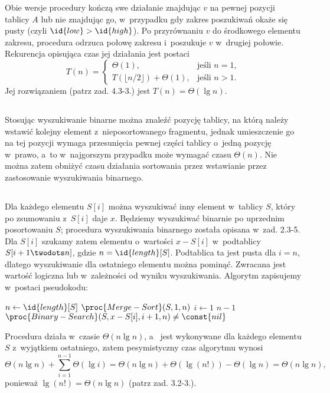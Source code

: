 Obie wersje procedury  kończą swe działanie znajdując $v$ na pewnej pozycji tablicy $A$ lub nie znajdując go, w~przypadku gdy zakres poszukiwań okaże się pusty (czyli $\id{low}>\id{high}$). Po przyrównaniu $v$ do środkowego elementu zakresu, procedura odrzuca połowę zakresu i~poszukuje $v$ w~drugiej połowie. Rekurencja opisująca czas jej działania jest postaci
\[
	T(n) = \left\{\begin{array}{ll}
		\Theta(1), & \mbox{jeśli } n=1, \\
		T(\lfloor n/2\rfloor)+\Theta(1), & \mbox{jeśli } n>1.
	\end{array}\right.
\]
Jej rozwiązaniem (patrz zad. 4.3-3.) jest $T(n)=\Theta(\lg n)$.

\subsection{} %
Stosując wyszukiwanie binarne można znaleźć pozycję tablicy, na którą należy wstawić kolejny element z~nieposortowanego fragmentu, jednak umieszczenie go na tej pozycji wymaga przesunięcia pewnej części tablicy o~jedną pozycję w~prawo, a~to w~najgorszym przypadku może wymagać czasu $\Theta(n)$. Nie można zatem obniżyć czasu działania sortowania przez wstawianie przez zastosowanie wyszukiwania binarnego.

\subsection{} %
Dla każdego elementu $S[i]$ można wyszukiwać inny element w~tablicy $S$, który po zsumowaniu z~$S[i]$ daje $x$. Będziemy wyszukiwać binarnie po uprzednim posortowaniu $S$; procedura wyszukiwania binarnego została opisana w~zad. \mbox{2.3-5}. Dla $S[i]$ szukamy zatem elementu o~wartości $x-S[i]$ w~podtablicy $S[i+1\twodots n]$, gdzie $n=\id{length}[S]$. Podtablica ta jest pusta dla $i=n$, dlatego wyszukiwanie dla ostatniego elementu można pominąć. Zwracana jest wartość logiczna  lub  w~zależności od wyniku wyszukiwania. Algorytm zapisujemy w~postaci pseudokodu:
\begin{codebox}
\li	$n\gets \id{length}[S]$
\li	$\proc{Merge-Sort}(S,1,n)$
\li	\For $i\gets 1$ \To $n-1$
\li		\Do
			\If $\proc{Binary-Search}(S,x-S[i],i+1,n)\ne\const{nil}$
\li				\Then
					\Return {}
				\End
		\End
\li	\Return {}
\end{codebox}

Procedura  działa w~czasie $\Theta(n\lg n)$, a~ jest wykonywane dla każdego elementu $S$ z~wyjątkiem ostatniego, zatem pesymistyczny czas algorytmu  wynosi
\[
	\Theta(n\lg n)+\sum_{i=1}^{n-1}\Theta(\lg i) = \Theta(n\lg n)+\Theta(\lg(n!))-\Theta(\lg n) = \Theta(n\lg n),
\]
ponieważ $\lg (n!)=\Theta(n\lg n)$ (patrz zad. 3.2-3.).

